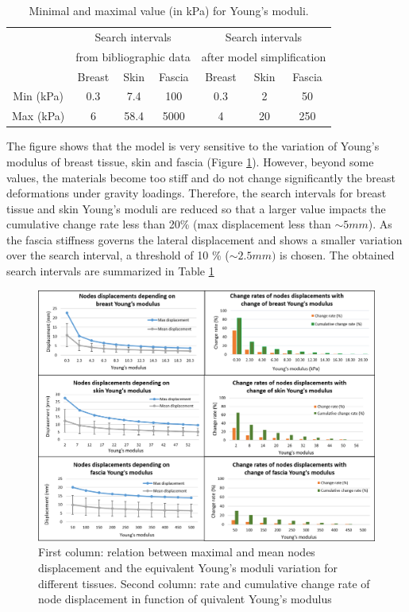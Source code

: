 \begin{table}[!h]
\centering
\begin{tabular}{|c||c|c|c||c|c|c|}
\hline
&\multicolumn{3}{|c||}{Search intervals}& \multicolumn{3}{c|}{Search intervals}\\
&\multicolumn{3}{|c||}{ from bibliographic data}& \multicolumn{3}{c|}{ after model simplification}\\
\hline
\hline
& Breast & Skin & Fascia & Breast & Skin & Fascia \\
\hline
Min (kPa)  & 0.3 & 7.4 & 100 & 0.3 & 2 & 50\\
\hline
Max (kPa) & 6 & 58.4 & 5000& 4& 20 &250 \\
\hline
\end{tabular}
\caption{Minimal and maximal value (in kPa) for Young's moduli.}
\label{table:minandmaxelasticmodulus}
\end{table}

The figure shows that the model is very sensitive to the variation of Young’s modulus of breast tissue, skin and fascia (Figure \ref{fig:materialPropDiscretization}). However, beyond some values, the materials become too stiff and do not change significantly the breast deformations under gravity loadings.  Therefore, the search intervals for breast tissue and skin Young's moduli are reduced so that a larger value impacts the cumulative change rate less than 20\% (max displacement less than $\sim 5mm$). As the fascia stiffness governs the lateral displacement and shows a smaller variation over the search interval, a threshold of 10 \% ($\sim 2.5mm)$ is chosen. The obtained search intervals are summarized in Table \ref{table:minandmaxelasticmodulus} 

\begin{figure}[!h]
\centering
\includegraphics[width=\textwidth,keepaspectratio]{figures/materialPropDiscretization.png} 
\caption{First column: relation between maximal and mean nodes displacement and the equivalent Young's moduli variation for different tissues. Second column: rate and cumulative change rate of node displacement in function of quivalent Young's modulus}\label{fig:materialPropDiscretization}
\end{figure}

